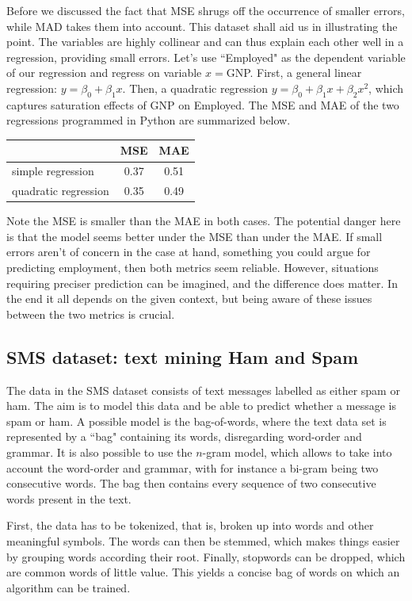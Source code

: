 \documentclass{llncs}
\begin{document}
Before we discussed the fact that MSE shrugs off the occurrence of smaller errors, while MAD takes them into account. This dataset shall aid us in illustrating the point. The variables are highly collinear and can thus explain each other well in a regression, providing small errors. Let's use ``Employed" as the dependent variable of our regression and regress on variable $x=$GNP. First, a general linear regression: $\displaystyle y = \beta_{0} + \beta_{1}x$. Then, a quadratic regression $\displaystyle y = \beta_{0} + \beta_{1}x +\beta_{2}x^{2}$, which captures saturation effects of GNP on Employed. The MSE and MAE of the two regressions programmed in Python are summarized below.
\begin{table}[H]
    \centering
    \begin{tabular}{l | c | c}
        & MSE & MAE\\ \hline
        simple regression & 0.37& 0.51 \\
        quadratic regression & 0.35 & 0.49
    \end{tabular}
    \label{table:MSE_vs_MAE}
\end{table}
\noindent Note the MSE is smaller than the MAE in both cases. The potential danger here is that the model seems better under the MSE than under the MAE. If small errors aren't of concern in the case at hand, something you could argue for predicting employment, then both metrics seem reliable. However, situations requiring preciser prediction can be imagined, and the difference does matter. In the end it all depends on the given context, but being aware of these issues between the two metrics is crucial.

\subsection{SMS dataset: text mining Ham and Spam}
The data in the SMS dataset consists of text messages labelled as either spam or ham. The aim is to model this data and be able to predict whether a message is spam or ham. A possible model is the bag-of-words, where the text data set is represented by a ``bag" containing its words, disregarding word-order and grammar. It is also possible to use the $n$-gram model, which allows to take into account the word-order and grammar, with for instance a bi-gram being two consecutive words. The bag then contains every sequence of two consecutive words present in the text. 

First, the data has to be tokenized, that is, broken up into words and other meaningful symbols. The words can then be stemmed, which makes things easier by grouping words according their root. Finally, stopwords can be dropped, which are common words of little value. This yields a concise bag of words on which an algorithm can be trained.
\end{document}
